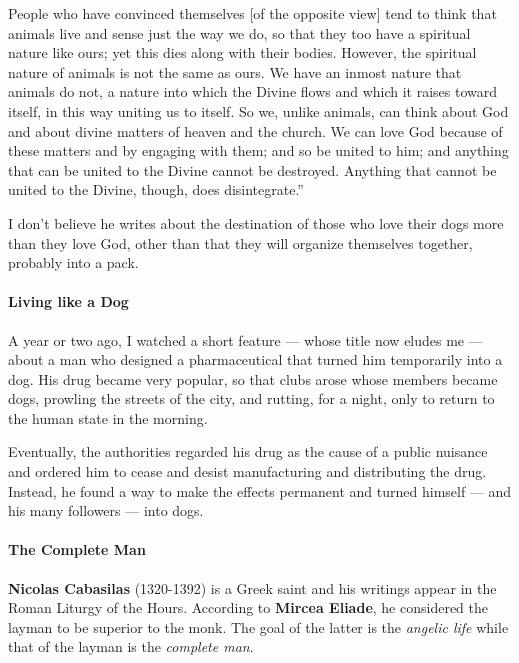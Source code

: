 \begin{quotex}
People who have convinced themselves [of the opposite view] tend to think that animals live and sense just the way we do, so that they too have a spiritual nature like ours; yet this dies along with their bodies. However, the spiritual nature of animals is not the same as ours. We have an inmost nature that animals do not, a nature into which the Divine flows and which it raises toward itself, in this way uniting us to itself. So we, unlike animals, can think about God and about divine matters of heaven and the church. We can love God because of these matters and by engaging with them; and so be united to him; and anything that can be united to the Divine cannot be destroyed. Anything that cannot be united to the Divine, though, does disintegrate.”

\end{quotex}
I don't believe he writes about the destination of those who love their dogs more than they love God, other than that they will organize themselves together, probably into a pack.

\paragraph{Living like a Dog}
A year or two ago, I watched a short feature — whose title now eludes me — about a man who designed a pharmaceutical that turned him temporarily into a dog. His drug became very popular, so that clubs arose whose members became dogs, prowling the streets of the city, and rutting, for a night, only to return to the human state in the morning.

Eventually, the authorities regarded his drug as the cause of a public nuisance and ordered him to cease and desist manufacturing and distributing the drug. Instead, he found a way to make the effects permanent and turned himself — and his many followers — into dogs.

\paragraph{The Complete Man}
\textbf{Nicolas Cabasilas} (1320-1392) is a Greek saint and his writings appear in the Roman Liturgy of the Hours. According to \textbf{Mircea Eliade}, he considered the layman to be superior to the monk. The goal of the latter is the \emph{angelic life} while that of the layman is the \emph{complete man}.

